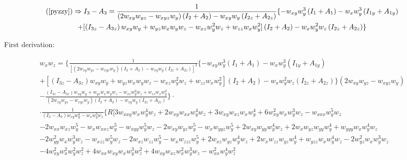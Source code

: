 \documentclass[12pt,a4paper]{article}
\begin{document}
	\begin{multline}
	  (\ref{pyzzy}) \Rightarrow I_3 - A_3 = \frac{1}{\left( 2 w_{xy} w_{yz} - w_{xyz} w_y \right) \left( I_2 + A_2 \right)
- w_{xy} w_y \left( I_{2z} + A_{2z} \right)} \{
- w_{xy} w_y^3 \left( I_1 + A_1 \right) - w_x w_y^3 \left( I_{1y} + A_{1y} \right) \\
+ [ \left( I_{3z} - A_{3z} \right) w_{xy} w_y + w_{yz} w_x w_y w_z
 - w_{xz} w_y^2 w_z + w_{zz} w_x w_y^2 ] \left( I_2 + A_2 \right)  - w_x w_y^2 w_z \left( I_{2z} + A_{2z} \right) \}
	\end{multline}


	First derivation:

    \footnotesize %
	\begin{multline*}
	  w_x w_z = \biggl\{
\frac{1}{\left[ \left( 2 w_{xy} w_{yz} - w_{xyz} w_y \right) \left( I_2 + A_2 \right)
- w_{xy} w_y \left( I_{2z} + A_{2z} \right) \right]^2} \{
- w_{xy} w_y^3 \left( I_1 + A_1 \right) - w_x w_y^3 \left( I_{1y} + A_{1y} \right) \\
+ [ \left( I_{3z} - A_{3z} \right) w_{xy} w_y + w_{yz} w_x w_y w_z
 - w_{xz} w_y^2 w_z + w_{zz} w_x w_y^2 ] \left( I_2 + A_2 \right)  - w_x w_y^2 w_z \left( I_{2z} + A_{2z} \right) \}
 \left( 2 w_{xy} w_{yz} - w_{xyz} w_y \right) \\
 -
\frac{\left( I_{3z} - A_{3z} \right) w_{xy} w_y + w_{yz} w_x w_y w_z
 - w_{xz} w_y^2 w_z + w_{zz} w_x w_y^2}{\left( 2 w_{xy} w_{yz} - w_{xyz} w_y \right) \left( I_2 + A_2 \right)
- w_{xy} w_y \left( I_{2z} + A_{2z} \right)}
 \biggr\} \cdot \\
\cdot \frac{1}{\left( I_3 - A_3 \right) w_{xy} w_y^4 - w_x w_y^5 w_z} \{ R [ 3 w_{xxy} w_x w_y^4 w_z + 2 w_{xy} w_{xx} w_y^4 w_z + 3 w_{xy} w_{xz} w_x w_y^4
	  + 6 w_{xy}^2 w_x w_y^3 w_z
	  - w_{xxx} w_y^5 w_z \\
	  - 2 w_{xx} w_{xz} w_y^5
	  - w_x w_{xxz} w_y^5
    	- w_{xyy} w_y^5 w_z
		- 2 w_{xy} w_{yz} w_y^5
		- w_x w_{yyz} w_y^5
		+ 2 w_{xy} w_{yy} w_y^4 w_z
		+ 2 w_x w_{yz} w_{yy} w_y^4
    	 + w_{yyy} w_x w_y^4 w_z \\
		 - 2 w_{yy}^2 w_x w_y^3 w_z
    	- w_{xzz} w_y^5 w_z
		- 2 w_{xz} w_{zz} w_y^5
		- w_x w_{zzz} w_y^5
		+ 2 w_{xz} w_{yz} w_y^4 w_z
		+ 2 w_x w_{zz} w_{yz} w_y^4
		+ w_{yzz} w_x w_y^4 w_z
    	 - 2 w_{yz}^2 w_x w_y^3 w_z \\
-4 w_{xy}^2 w_x^2 w_y^2 w_z^2
	  +4 w_{xx} w_{xy} w_x w_y^3 w_z^2
	  +4 w_{xy} w_{xz} w_x^2 w_y^3 w_z
	  - w_{xx}^2 w_y^4 w_z^2

\end{multline*}
\end{document}
